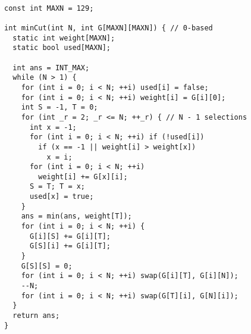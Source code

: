 \begin{lstlisting}

const int MAXN = 129;

int minCut(int N, int G[MAXN][MAXN]) { // 0-based
  static int weight[MAXN];
  static bool used[MAXN];

  int ans = INT_MAX;
  while (N > 1) {
    for (int i = 0; i < N; ++i) used[i] = false;
    for (int i = 0; i < N; ++i) weight[i] = G[i][0];
    int S = -1, T = 0;
    for (int _r = 2; _r <= N; ++_r) { // N - 1 selections
      int x = -1;
      for (int i = 0; i < N; ++i) if (!used[i])
        if (x == -1 || weight[i] > weight[x])
          x = i;
      for (int i = 0; i < N; ++i)
        weight[i] += G[x][i];
      S = T; T = x;
      used[x] = true;
    }
    ans = min(ans, weight[T]);
    for (int i = 0; i < N; ++i) {
      G[i][S] += G[i][T];
      G[S][i] += G[i][T];
    }
    G[S][S] = 0;
    for (int i = 0; i < N; ++i) swap(G[i][T], G[i][N]);
    --N;
    for (int i = 0; i < N; ++i) swap(G[T][i], G[N][i]);
  }
  return ans;
}

\end{lstlisting}